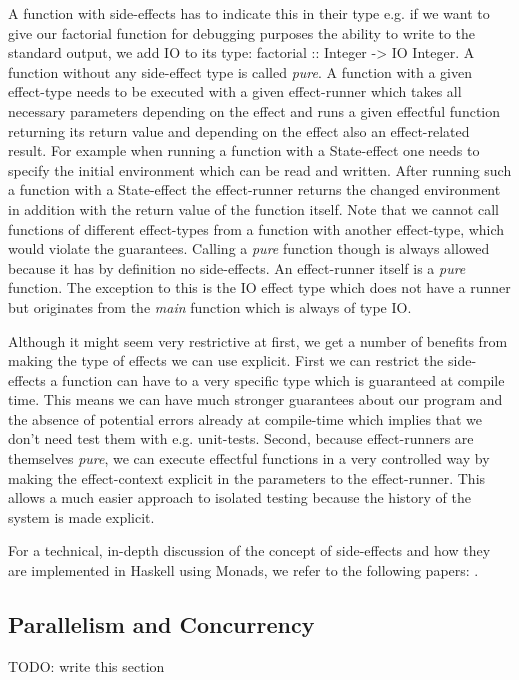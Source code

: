 A function with side-effects has to indicate this in their type e.g. if we want to give our factorial function for debugging purposes the ability to write to the standard output, we add IO to its type: factorial :: Integer -> IO Integer. A function without any side-effect type is called \textit{pure}. A function with a given effect-type needs to be executed with a given effect-runner which takes all necessary parameters depending on the effect and runs a given effectful function returning its return value and depending on the effect also an effect-related result. For example when running a function with a State-effect one needs to specify the initial environment which can be read and written. After running such a function with a State-effect the effect-runner returns the changed environment in addition with the return value of the function itself. Note that we cannot call functions of different effect-types from a function with another effect-type, which would violate the guarantees. Calling a \textit{pure} function though is always allowed because it has by definition no side-effects. An effect-runner itself is a \textit{pure} function. The exception to this is the IO effect type which does not have a runner but originates from the \textit{main} function which is always of type IO.

Although it might seem very restrictive at first, we get a number of benefits from making the type of effects we can use explicit. First we can restrict the side-effects a function can have to a very specific type which is guaranteed at compile time. This means we can have much stronger guarantees about our program and the absence of potential errors already at compile-time which implies that we don't need test them with e.g. unit-tests. Second, because effect-runners are themselves \textit{pure}, we can execute effectful functions in a very controlled way by making the effect-context explicit in the parameters to the effect-runner. This allows a much easier approach to isolated testing because the history of the system is made explicit.

For a technical, in-depth discussion of the concept of side-effects and how they are implemented in Haskell using Monads, we refer to the following papers: \cite{moggi_computational_1989, wadler_essence_1992, wadler_monads_1995, wadler_how_1997, jones_tackling_2002}.

\subsection{Parallelism and Concurrency}
TODO: write this section

